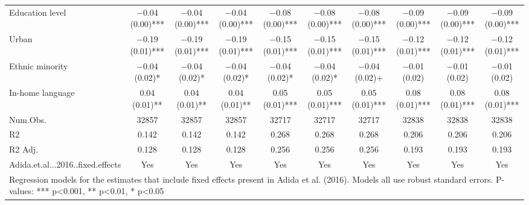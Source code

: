 \begin{table}[H]
\begin{tabular}[t]{lccccccccc}
Education level & \num{-0.04} (\num{0.00})*** & \num{-0.04} (\num{0.00})*** & \num{-0.04} (\num{0.00})*** & \num{-0.08} (\num{0.00})*** & \num{-0.08} (\num{0.00})*** & \num{-0.08} (\num{0.00})*** & \num{-0.09} (\num{0.00})*** & \num{-0.09} (\num{0.00})*** & \num{-0.09} (\num{0.00})***\\
Urban & \num{-0.19} (\num{0.01})*** & \num{-0.19} (\num{0.01})*** & \num{-0.19} (\num{0.01})*** & \num{-0.15} (\num{0.01})*** & \num{-0.15} (\num{0.01})*** & \num{-0.15} (\num{0.01})*** & \num{-0.12} (\num{0.01})*** & \num{-0.12} (\num{0.01})*** & \num{-0.12} (\num{0.01})***\\
Ethnic minority & \num{-0.04} (\num{0.02})* & \num{-0.04} (\num{0.02})* & \num{-0.04} (\num{0.02})* & \num{-0.04} (\num{0.02})* & \num{-0.04} (\num{0.02})* & \num{-0.04} (\num{0.02})+ & \num{-0.01} (\num{0.02}) & \num{-0.01} (\num{0.02}) & \num{-0.01} (\num{0.02})\\
In-home language & \num{0.04} (\num{0.01})** & \num{0.04} (\num{0.01})** & \num{0.04} (\num{0.01})** & \num{0.05} (\num{0.01})*** & \num{0.05} (\num{0.01})*** & \num{0.05} (\num{0.01})*** & \num{0.08} (\num{0.01})*** & \num{0.08} (\num{0.01})*** & \num{0.08} (\num{0.01})***\\
\midrule
Num.Obs. & \num{32857} & \num{32857} & \num{32857} & \num{32717} & \num{32717} & \num{32717} & \num{32838} & \num{32838} & \num{32838}\\
R2 & \num{0.142} & \num{0.142} & \num{0.142} & \num{0.268} & \num{0.268} & \num{0.268} & \num{0.206} & \num{0.206} & \num{0.206}\\
R2 Adj. & \num{0.128} & \num{0.128} & \num{0.128} & \num{0.256} & \num{0.256} & \num{0.256} & \num{0.193} & \num{0.193} & \num{0.193}\\
Adida.et.al...2016..fixed.effects & Yes & Yes & Yes & Yes & Yes & Yes & Yes & Yes & Yes\\
\bottomrule
\multicolumn{10}{l}{\rule{0pt}{1em}Regression models for the estimates that include fixed effects present in Adida et al. (2016). Models all use robust standard errors. P-values: *** p<0.001, ** p<0.01, * p<0.05}\\
\end{tabular}
\end{table}
